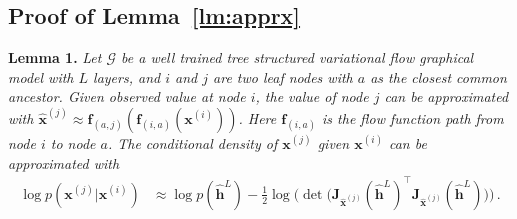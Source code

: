 \documentclass{article}
\begin{document}
\subsection{Proof of Lemma~\ref{lm:apprx}}\label{appd:proof_lm1}
\textbf{Lemma 1.} {\it Let $\mathcal{G}$ be a well trained tree structured variational flow graphical model with $L$ layers, and $i$ and $j$ are two leaf nodes with $a$ as the closest common ancestor. 
Given observed value at node $i$, the value of node $j$ can be approximated with $\widehat{\mathbf{x}}^{(j)} \approx  \mathbf{f}_{(a,j)}(\mathbf{f}_{(i, a)}(\mathbf{x}^{(i)}))$. Here $\mathbf{f}_{(i, a)}$ is the flow function path from node $i$ to node $a$. 
The conditional density of $\mathbf{x}^{(j)}$ given $\mathbf{x}^{(i)}$ can be approximated with 
\begin{align*} %
\log p(\mathbf{x}^{(j)} | \mathbf{x}^{(i)}) &\approx  \log p(\widehat{\mathbf{h}}^L) -  \frac{1}{2} \log \big(\det \big(\mathbf{J}_{\widehat{\mathbf{x}}^{(j)}}(\widehat{\mathbf{h}}^L)^\top\mathbf{J}_{\widehat{\mathbf{x}}^{(j)}}(\widehat{\mathbf{h}}^L)\big) \big) \, .
\end{align*}
}
\end{document}
